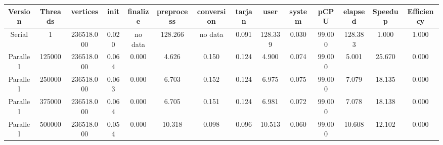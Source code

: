\begin{tabular}{|c|c|c|c|c|c|c|c|c|c|c|c|c|c|}
\toprule
 Version &  Threads &   vertices &  init & finalize &  preprocess & conversion &  tarjan &    user &  system &   pCPU &  elapsed &  Speedup &  Efficiency \\
\midrule
  Serial &        1 & 236518.000 & 0.020 &  no data &     128.266 &    no data &   0.091 & 128.339 &   0.030 & 99.000 &  128.383 &    1.000 &       1.000 \\
Parallel &   125000 & 236518.000 & 0.064 &    0.000 &       4.626 &      0.150 &   0.124 &   4.900 &   0.074 & 99.000 &    5.001 &   25.670 &       0.000 \\
Parallel &   250000 & 236518.000 & 0.063 &    0.000 &       6.703 &      0.152 &   0.124 &   6.975 &   0.075 & 99.000 &    7.079 &   18.135 &       0.000 \\
Parallel &   375000 & 236518.000 & 0.064 &    0.000 &       6.705 &      0.151 &   0.124 &   6.981 &   0.072 & 99.000 &    7.078 &   18.138 &       0.000 \\
Parallel &   500000 & 236518.000 & 0.054 &    0.000 &      10.318 &      0.098 &   0.096 &  10.513 &   0.060 & 99.000 &   10.608 &   12.102 &       0.000 \\
\bottomrule
\end{tabular}
